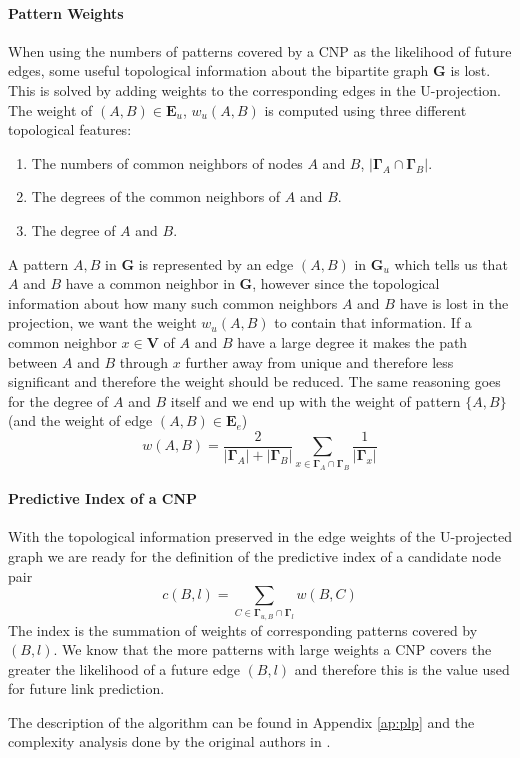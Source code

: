 \paragraph{Pattern Weights}
When using the numbers of patterns covered by a CNP as the likelihood of future edges, some useful topological information about the bipartite graph $\textbf{G}$ is lost. This is solved by adding weights to the corresponding edges in the U-projection. The weight of $(A,B)\in\textbf{E}_u$, $w_u(A,B)$ is computed using three different topological features:
\begin{enumerate}
\item The numbers of common neighbors of nodes $A$ and $B$, $|\bm{\Gamma}_{A}\cap\bm{\Gamma}_{B}|$.
\item The degrees of the common neighbors of $A$ and $B$.
\item The degree of $A$ and $B$.
\end{enumerate}
A pattern ${A,B}$ in $\textbf{G}$ is represented by an edge $(A,B)$ in $\textbf{G}_u$ which tells us that $A$ and $B$ have a common neighbor in $\textbf{G}$, however since the topological information about how many such common neighbors $A$ and $B$ have is lost in the projection, we want the weight $w_u(A,B)$ to contain that information. If a common neighbor $x\in\textbf{V}$ of $A$ and $B$ have a large degree it makes the path between $A$ and $B$ through $x$ further away from unique and therefore less significant and therefore the weight should be reduced. The same reasoning goes for the degree of $A$ and $B$ itself and we end up with the weight of pattern $\{A,B\}$ (and the weight of edge $(A,B)\in\textbf{E}_e$)
$$
    w(A,B) = \frac{2}{|\bm{\Gamma}_{A}|+|\bm{\Gamma}_{B}|} \sum_{x\in\bm{\Gamma}_{A}\cap\bm{\Gamma}_{B}} \frac{1}{|\bm{\Gamma}_{x}|}
$$

\paragraph{Predictive Index of a CNP}
With the topological information preserved in the edge weights of the U-projected graph we are ready for the definition of the predictive index of a candidate node pair
$$
 c(B,l) = \sum_{C\in\bm{\Gamma}_{u,B} \cap \bm{\Gamma}_{l} } w(B,C)
$$
The index is the summation of weights of corresponding patterns covered by $(B,l)$. We know that the more patterns with large weights a CNP covers the greater the likelihood of a future edge $(B,l)$ and therefore this is the value used for future link prediction.

The description of the algorithm can be found in Appendix \ref{ap:plp} and the complexity analysis done by the original authors in \cite{plp}.
